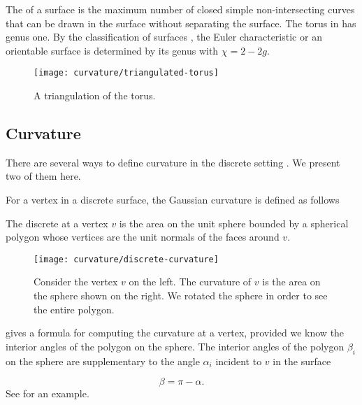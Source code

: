 The  of a surface is the maximum number of closed simple
non-intersecting curves that can be drawn in the surface without separating
the surface.
The torus in  has genus one.
By the classification of surfaces \cite{munkres}, the Euler characteristic or an orientable surface
is determined by its genus with $\chi=2-2g$.



\begin{figure}[htb]
\centering
\texttt{[image: curvature/triangulated-torus]}
\caption{A triangulation of the torus.}
\label{fig:triangulated-torus}
\end{figure}

\subsection{Curvature}

There are several ways to define curvature in the discrete setting \cite{Crane:2013}.
We present two of them here. 


For a vertex in a discrete surface, the Gaussian curvature is defined as
follows

\begin{definition}\label{def:discrete-curvature-vertex}

The discrete  at a vertex $v$ is the area on the unit sphere bounded by a spherical polygon whose vertices are the unit normals of the faces around $v$.

\end{definition}


\begin{figure}[htb]
\centering
\texttt{[image: curvature/discrete-curvature]}
\caption{Consider the vertex $v$ on the left. The curvature of $v$
is the area on the sphere shown on the right. We rotated the sphere
in order to see the entire polygon.}
\label{fig:discrete-curvature}
\end{figure}


 gives a formula for computing the curvature at a vertex, provided
we know the interior angles of the polygon on the sphere.
The interior angles of the polygon $\beta_i$ on the sphere are supplementary to
the angle $\alpha_i$ incident to $v$ in the surface

\begin{equation} \label{eqn:switcheroo}
\beta=\pi-\alpha.
\end{equation}
See  for an example.




